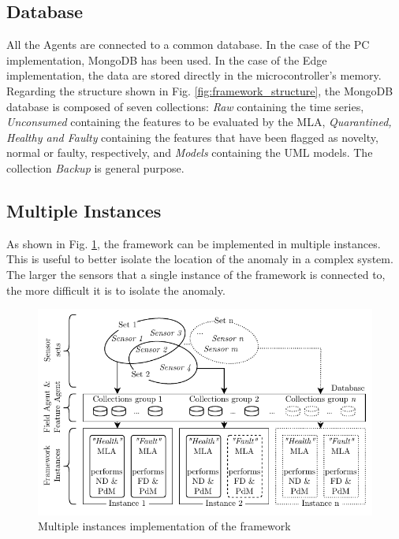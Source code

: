 \subsection{Database}
All the Agents are connected to a common database. In the case of the PC implementation, MongoDB has been used. In the case of the Edge implementation, the data are stored directly in the microcontroller's memory.
Regarding the structure shown in Fig. \ref{fig:framework_structure}, the MongoDB database is composed of seven collections: \emph{Raw} containing the time series, \emph{Unconsumed} containing the features to be evaluated by the MLA, \emph{Quarantined, Healthy and Faulty} containing the features that have been flagged as novelty, normal or faulty, respectively, and \emph{Models} containing the UML models. The collection \emph{Backup} is general purpose.

\subsection{Multiple Instances}
As shown in Fig. \ref{fig:multiple_instances}, the framework can be implemented in multiple instances. This is useful to better isolate the location of the anomaly in a complex system. The larger the sensors that a single instance of the framework is connected to, the more difficult it is to isolate the anomaly.

\begin{figure}
    \includegraphics[width=\linewidth]{images/FrameworkInstances.pdf}
    \caption{Multiple instances implementation of the framework}
    \label{fig:multiple_instances}
\end{figure}
